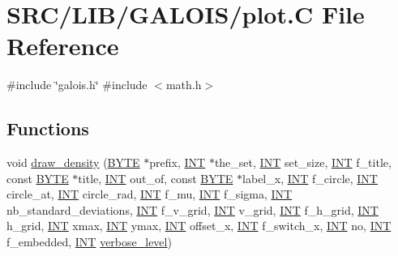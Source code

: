 \hypertarget{plot_8_c}{}\section{S\+R\+C/\+L\+I\+B/\+G\+A\+L\+O\+I\+S/plot.C File Reference}
\label{plot_8_c}
{\ttfamily \#include \char`\"{}galois.\+h\char`\"{}}\newline
{\ttfamily \#include $<$math.\+h$>$}\newline
\subsection*{Functions}
\begin{DoxyCompactItemize}
\item 
void \mbox{\hyperlink{plot_8_c_aacb709615412b4c930421172d579dbba}{draw\+\_\+density}} (\mbox{\hyperlink{galois_8h_ab6cc7b4aeb6ea31aba2b3fbfc83ff5e6}{B\+Y\+TE}} $\ast$prefix, \mbox{\hyperlink{galois_8h_a09fddde158a3a20bd2dcadb609de11dc}{I\+NT}} $\ast$the\+\_\+set, \mbox{\hyperlink{galois_8h_a09fddde158a3a20bd2dcadb609de11dc}{I\+NT}} set\+\_\+size, \mbox{\hyperlink{galois_8h_a09fddde158a3a20bd2dcadb609de11dc}{I\+NT}} f\+\_\+title, const \mbox{\hyperlink{galois_8h_ab6cc7b4aeb6ea31aba2b3fbfc83ff5e6}{B\+Y\+TE}} $\ast$title, \mbox{\hyperlink{galois_8h_a09fddde158a3a20bd2dcadb609de11dc}{I\+NT}} out\+\_\+of, const \mbox{\hyperlink{galois_8h_ab6cc7b4aeb6ea31aba2b3fbfc83ff5e6}{B\+Y\+TE}} $\ast$label\+\_\+x, \mbox{\hyperlink{galois_8h_a09fddde158a3a20bd2dcadb609de11dc}{I\+NT}} f\+\_\+circle, \mbox{\hyperlink{galois_8h_a09fddde158a3a20bd2dcadb609de11dc}{I\+NT}} circle\+\_\+at, \mbox{\hyperlink{galois_8h_a09fddde158a3a20bd2dcadb609de11dc}{I\+NT}} circle\+\_\+rad, \mbox{\hyperlink{galois_8h_a09fddde158a3a20bd2dcadb609de11dc}{I\+NT}} f\+\_\+mu, \mbox{\hyperlink{galois_8h_a09fddde158a3a20bd2dcadb609de11dc}{I\+NT}} f\+\_\+sigma, \mbox{\hyperlink{galois_8h_a09fddde158a3a20bd2dcadb609de11dc}{I\+NT}} nb\+\_\+standard\+\_\+deviations, \mbox{\hyperlink{galois_8h_a09fddde158a3a20bd2dcadb609de11dc}{I\+NT}} f\+\_\+v\+\_\+grid, \mbox{\hyperlink{galois_8h_a09fddde158a3a20bd2dcadb609de11dc}{I\+NT}} v\+\_\+grid, \mbox{\hyperlink{galois_8h_a09fddde158a3a20bd2dcadb609de11dc}{I\+NT}} f\+\_\+h\+\_\+grid, \mbox{\hyperlink{galois_8h_a09fddde158a3a20bd2dcadb609de11dc}{I\+NT}} h\+\_\+grid, \mbox{\hyperlink{galois_8h_a09fddde158a3a20bd2dcadb609de11dc}{I\+NT}} xmax, \mbox{\hyperlink{galois_8h_a09fddde158a3a20bd2dcadb609de11dc}{I\+NT}} ymax, \mbox{\hyperlink{galois_8h_a09fddde158a3a20bd2dcadb609de11dc}{I\+NT}} offset\+\_\+x, \mbox{\hyperlink{galois_8h_a09fddde158a3a20bd2dcadb609de11dc}{I\+NT}} f\+\_\+switch\+\_\+x, \mbox{\hyperlink{galois_8h_a09fddde158a3a20bd2dcadb609de11dc}{I\+NT}} no, \mbox{\hyperlink{galois_8h_a09fddde158a3a20bd2dcadb609de11dc}{I\+NT}} f\+\_\+embedded, \mbox{\hyperlink{galois_8h_a09fddde158a3a20bd2dcadb609de11dc}{I\+NT}} \mbox{\hyperlink{simeon_8_c_a818073fbcc2f439e7c56952f67386122}{verbose\+\_\+level}})

\end{DoxyCompactItemize}
